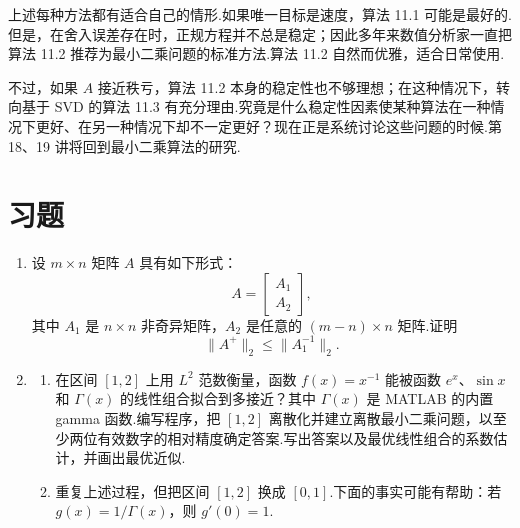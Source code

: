 \documentclass[UTF8,fontset=none,12pt]{ctexart}
\theoremstyle{definition}
\begin{document}
上述每种方法都有适合自己的情形.如果唯一目标是速度，算法 11.1 可能是最好的.但是，在舍入误差存在时，正规方程并不总是稳定；因此多年来数值分析家一直把算法 11.2 推荐为最小二乘问题的标准方法.算法 11.2 自然而优雅，适合日常使用.

不过，如果 $A$ 接近秩亏，算法 11.2 本身的稳定性也不够理想；在这种情况下，转向基于 SVD 的算法 11.3 有充分理由.究竟是什么稳定性因素使某种算法在一种情况下更好、在另一种情况下却不一定更好？现在正是系统讨论这些问题的时候.第 18、19 讲将回到最小二乘算法的研究.

\section*{习题}

\begin{enumerate}[label=\textbf{11.\arabic*}]
    \item 设 $m\times n$ 矩阵 $A$ 具有如下形式：
    \[
        A=
        \begin{bmatrix}
            A_1\\
            A_2
        \end{bmatrix},
    \]
    其中 $A_1$ 是 $n\times n$ 非奇异矩阵，$A_2$ 是任意的 $(m-n)\times n$ 矩阵.证明
    \[
        \|A^+\|_2\le \|A_1^{-1}\|_2.
    \]

    \item
    \begin{enumerate}[label=(\alph*)]
        \item 在区间 $[1,2]$ 上用 $L^2$ 范数衡量，函数 $f(x)=x^{-1}$ 能被函数 $e^x$、$\sin x$ 和 $\Gamma(x)$ 的线性组合拟合到多接近？其中 $\Gamma(x)$ 是 MATLAB 的内置 gamma 函数.编写程序，把 $[1,2]$ 离散化并建立离散最小二乘问题，以至少两位有效数字的相对精度确定答案.写出答案以及最优线性组合的系数估计，并画出最优近似.
        \item 重复上述过程，但把区间 $[1,2]$ 换成 $[0,1]$.下面的事实可能有帮助：若 $g(x)=1/\Gamma(x)$，则 $g'(0)=1$.
    \end{enumerate}


\end{enumerate}
\end{document}
